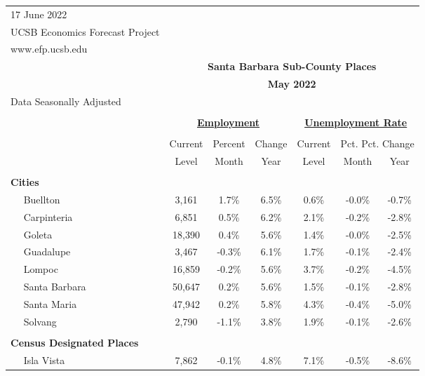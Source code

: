 \documentclass[12pt]{article}
\begin{document}
\begin{landscape}
\begin{table}
\begin{tabular}{|l|c|c|c||c|c|c|}
\multicolumn{1}{l}{\small 17 June 2022} & \multicolumn{6}{c}{} \\
\multicolumn{1}{l}{\small UCSB Economics Forecast Project} & \multicolumn{6}{c}{} \\
\multicolumn{1}{l}{\small www.efp.ucsb.edu} & \multicolumn{6}{c}{} \\
\multicolumn{1}{c}{} & \multicolumn{6}{c}{\large \textbf{Santa Barbara Sub-County Places}} \\
\multicolumn{1}{c}{} & \multicolumn{6}{c}{\large \textbf{May 2022}} \\
\multicolumn{7}{l}{\small Data Seasonally Adjusted} \\ \hline \hline
& \multicolumn{5}{c}{} & \\
& \multicolumn{3}{c}{\textbf{\underline{Employment}} } & \multicolumn{3}{c}{\textbf{\underline{Unemployment Rate}} } \vline \\
& \multicolumn{2}{c}{} & & \multicolumn{2}{c}{} & \\
& Current & \multicolumn{1}{r}{Percent} & Change & Current & \multicolumn{2}{c}{Pct. Pct. Change} \vline \\
& Level & Month & Year & Level & Month & Year \\ \hline
&&&&&& \\
\textbf{Cities} &&&&&& \\
$\quad$ Buellton & 3,161 & 1.7\% & 6.5\% & 0.6\% & -0.0\% & -0.7\% \\
$\quad$ Carpinteria & 6,851 & 0.5\% & 6.2\% & 2.1\% & -0.2\% & -2.8\% \\
$\quad$ Goleta & 18,390 & 0.4\% & 5.6\% & 1.4\% & -0.0\% & -2.5\% \\
$\quad$ Guadalupe & 3,467 & -0.3\% & 6.1\% & 1.7\% & -0.1\% & -2.4\% \\
$\quad$ Lompoc & 16,859 & -0.2\% & 5.6\% & 3.7\% & -0.2\% & -4.5\% \\
$\quad$ Santa Barbara & 50,647 & 0.2\% & 5.6\% & 1.5\% & -0.1\% & -2.8\% \\
$\quad$ Santa Maria & 47,942 & 0.2\% & 5.8\% & 4.3\% & -0.4\% & -5.0\% \\
$\quad$ Solvang & 2,790 & -1.1\% & 3.8\% & 1.9\% & -0.1\% & -2.6\% \\
&&&&&& \\
\textbf{Census Designated Places} &&&&&& \\
$\quad$ Isla Vista & 7,862 & -0.1\% & 4.8\% & 7.1\% & -0.5\% & -8.6\% \\

\end{tabular}
\end{table}
\end{landscape}
\end{document}
